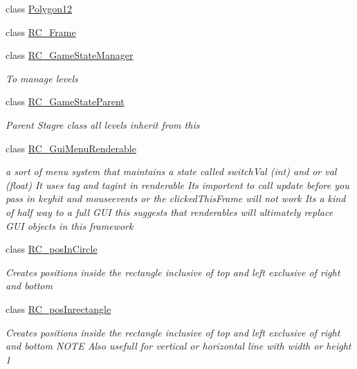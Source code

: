 \begin{DoxyCompactItemize}
\item 
class \mbox{\hyperlink{class_r_c___framework_1_1_polygon12}{Polygon12}}
\item 
class \mbox{\hyperlink{class_r_c___framework_1_1_r_c___frame}{R\+C\+\_\+\+Frame}}
\item 
class \mbox{\hyperlink{class_r_c___framework_1_1_r_c___game_state_manager}{R\+C\+\_\+\+Game\+State\+Manager}}
\begin{DoxyCompactList}\small\item\em To manage levels ~\newline
\end{DoxyCompactList}\item 
class \mbox{\hyperlink{class_r_c___framework_1_1_r_c___game_state_parent}{R\+C\+\_\+\+Game\+State\+Parent}}
\begin{DoxyCompactList}\small\item\em Parent Stagre class all levels inherit from this \end{DoxyCompactList}\item 
class \mbox{\hyperlink{class_r_c___framework_1_1_r_c___gui_menu_renderable}{R\+C\+\_\+\+Gui\+Menu\+Renderable}}
\begin{DoxyCompactList}\small\item\em a sort of menu system that maintains a state called switch\+Val (int) and or val (float) It uses tag and tagint in renderable Its importent to call update before you pass in keyhit and mouseevents or the clicked\+This\+Frame will not work Its a kind of half way to a full G\+UI this suggests that renderables will ultimately replace G\+UI objects in this framework \end{DoxyCompactList}\item 
class \mbox{\hyperlink{class_r_c___framework_1_1_r_c__pos_in_circle}{R\+C\+\_\+pos\+In\+Circle}}
\begin{DoxyCompactList}\small\item\em Creates positions inside the rectangle inclusive of top and left exclusive of right and bottom \end{DoxyCompactList}\item 
class \mbox{\hyperlink{class_r_c___framework_1_1_r_c__pos_inrectangle}{R\+C\+\_\+pos\+Inrectangle}}
\begin{DoxyCompactList}\small\item\em Creates positions inside the rectangle inclusive of top and left exclusive of right and bottom N\+O\+TE Also usefull for vertical or horizontal line with width or height 1 \end{DoxyCompactList}\item 

\end{DoxyCompactItemize}
